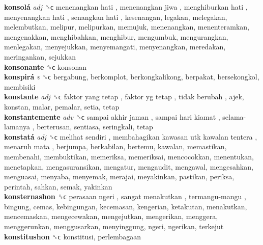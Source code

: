 \textbf{konsolá} \emph{adj}  ␝ϲ   menenangkan hati ,  menenangkan jiwa ,  menghiburkan hati ,  menyenangkan hati ,  senangkan hati , kesenangan, legakan, melegakan, melembutkan, melipur, melipurkan, memujuk, menenangkan, menenteramkan, mengenakkan, menghibahkan, menghibur, mengumbuk, mengurangkan, menlegakan, menyejukkan, menyemangati, menyenangkan, meredakan, meringankan, sejukkan  \\
\textbf{konsonante} ␝ϲ  konsonan  \\
\textbf{konspirá} \emph{v}  ␝ϲ  bergabung, berkomplot, berkongkalikong, berpakat, bersekongkol, membisiki  \\
\textbf{konstante} \emph{adj}  ␝ϲ   faktor yang tetap ,  faktor yg tetap ,  tidak berubah , ajek, konstan, malar, pemalar, setia, tetap  \\
\textbf{konstantemente} \emph{adv}  ␝ϲ   sampai akhir jaman ,  sampai hari kiamat ,  selama-lamanya , berterusan, sentiasa, seringkali, tetap  \\
\textbf{konstatá} \emph{adj}  ␝ϲ   melihat sendiri ,  membahagikan kawasan utk kawalan tentera ,  menaruh mata , berjumpa, berkabilan, bertemu, kawalan, memastikan, membenahi, membuktikan, memeriksa, memeriksai, mencocokkan, menentukan, menetapkan, mengasuransikan, mengatur, mengaudit, mengawal, mengesahkan, menguasai, menyaba, menyemak, merajai, meyakinkan, pastikan, periksa, perintah, sahkan, semak, yakinkan  \\
\textbf{konsternashon} ␝ϲ   perasaan ngeri ,  sangat menakutkan ,  termangu-mangu , bingung, cemas, kebingungan, kecemasan, kengerian, ketakutan, menakutkan, mencemaskan, mengecewakan, mengejutkan, mengerikan, menggera, menggerunkan, menggusarkan, menyinggung, ngeri, ngerikan, terkejut  \\
\textbf{konstitushon} ␝ϲ  konstitusi, perlembagaan  \\
